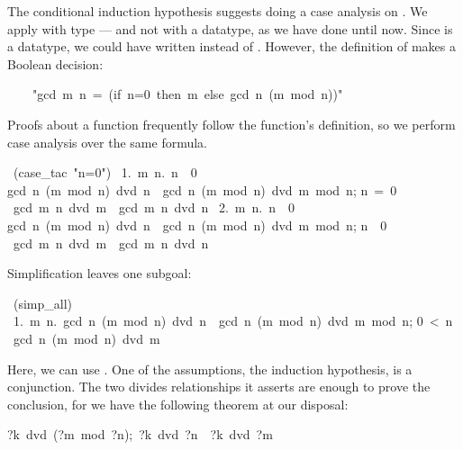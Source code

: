 The conditional induction hypothesis suggests doing a case
analysis on .  We apply  with type
 --- and not with a datatype, as we have done until now.  Since
 is a datatype, we could have written
 instead of .  However, the definition
of  makes a Boolean decision:
\begin{isabelle}
\ \ \ \ "gcd\ m\ n\ =\ (if\ n=0\ then\ m\ else\ gcd\ n\ (m\ mod\ n))"
\end{isabelle}
Proofs about a function frequently follow the function's definition, so we perform
case analysis over the same formula.
\begin{isabelle}
\ (case_tac\ "n=0")\isanewline
\ 1.\ \isasymAnd m\ n.\ \isasymlbrakk n\ \isasymnoteq \ 0\ \isasymLongrightarrow \isanewline
{}gcd\ n\ (m\ mod\ n)\ dvd\ n\ \isasymand \ gcd\ n\ (m\ mod\ n)\ dvd\ m\ mod\ n;\isanewline
{}n\ =\ 0\isasymrbrakk \isanewline
{}\isasymLongrightarrow \ gcd\ m\ n\ dvd\ m\ \isasymand \ gcd\ m\ n\ dvd\ n\isanewline
\ 2.\ \isasymAnd m\ n.\ \isasymlbrakk n\ \isasymnoteq \ 0\ \isasymLongrightarrow \isanewline
{}gcd\ n\ (m\ mod\ n)\ dvd\ n\ \isasymand \ gcd\ n\ (m\ mod\ n)\ dvd\ m\ mod\ n;\isanewline
{}n\ \isasymnoteq \ 0\isasymrbrakk \isanewline
{}\isasymLongrightarrow \ gcd\ m\ n\ dvd\ m\ \isasymand \ gcd\ m\ n\ dvd\ n%
\end{isabelle}
%
Simplification leaves one subgoal: 
\begin{isabelle}
\ (simp_all)\isanewline
\ 1.\ \isasymAnd m\ n.\ \isasymlbrakk gcd\ n\ (m\ mod\ n)\ dvd\ n\ \isasymand \ gcd\ n\ (m\ mod\ n)\ dvd\ m\ mod\ n;\isanewline
{}0\ <\ n\isasymrbrakk \isanewline
{}\isasymLongrightarrow \ gcd\ n\ (m\ mod\ n)\ dvd\ m%
\end{isabelle}
%
Here, we can use .  
One of the assumptions, the induction hypothesis, is a conjunction. 
The two divides relationships it asserts are enough to prove 
the conclusion, for we have the following theorem at our disposal: 
\begin{isabelle}
\isasymlbrakk?k\ dvd\ (?m\ mod\ ?n){;}\ ?k\ dvd\ ?n\isasymrbrakk\ \isasymLongrightarrow\ ?k\ dvd\ ?m%
\end{isabelle}
